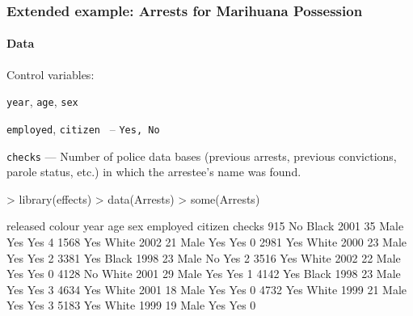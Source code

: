 \begin{frame}[fragile]
	\frametitle{Extended example: Arrests for Marihuana Possession}
	\framesubtitle{Data}
  \alert{Control} variables:
  \begin{itemize*}
  	\item \texttt{year}, \texttt{age}, \texttt{sex}
  	\item \texttt{employed},  \texttt{citizen } -- \texttt{Yes, No}
  	\item \texttt{checks} --- Number of police data bases (previous
arrests, previous convictions, parole status, etc.) in which the arrestee's
name was found.
  \end{itemize*}

\begin{Schunk}
\begin{Sinput}
> library(effects)
> data(Arrests)
> some(Arrests)
\end{Sinput}
\begin{Soutput}
     released colour year age  sex employed citizen checks
915        No  Black 2001  35 Male      Yes     Yes      4
1568      Yes  White 2002  21 Male      Yes     Yes      0
2981      Yes  White 2000  23 Male      Yes     Yes      2
3381      Yes  Black 1998  23 Male       No     Yes      2
3516      Yes  White 2002  22 Male      Yes     Yes      0
4128       No  White 2001  29 Male      Yes     Yes      1
4142      Yes  Black 1998  23 Male      Yes     Yes      3
4634      Yes  White 2001  18 Male      Yes     Yes      0
4732      Yes  White 1999  21 Male      Yes     Yes      3
5183      Yes  White 1999  19 Male      Yes     Yes      0
\end{Soutput}
\end{Schunk}
\end{frame}

